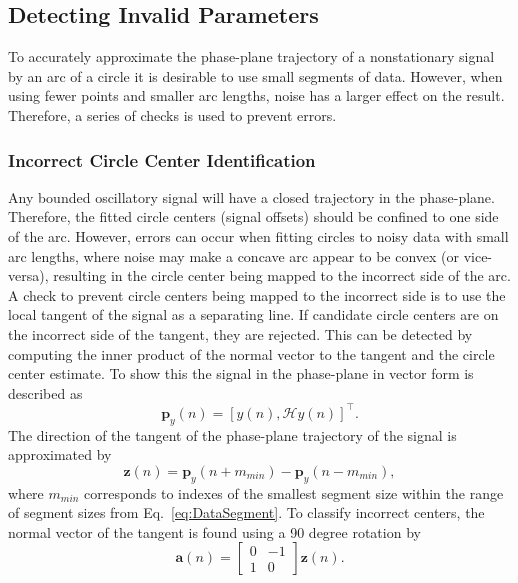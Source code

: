 \documentclass[journal,11pt,a4paper,onecolumn,draftcls]{IEEEtran}
\begin{document}
\subsection{Detecting Invalid Parameters}\label{sect:DetectingInvalidParameters}
To accurately approximate the phase-plane trajectory of a nonstationary signal by an arc of a circle it is desirable to use small segments of data. However, when using fewer points and smaller arc lengths, noise has a larger effect on the result. Therefore, a series of checks is used to prevent errors. 
\subsubsection{Incorrect Circle Center Identification}
Any bounded oscillatory signal will have a closed trajectory in the phase-plane. Therefore, the fitted circle centers (signal offsets) should be confined to one side of the arc. However, errors can occur when fitting circles to noisy data with small arc lengths, where noise may make a concave arc appear to be convex (or vice-versa), resulting in the circle center being mapped to the incorrect side of the arc. A check to prevent circle centers being mapped to the incorrect side is to use the local tangent of the signal as a separating line. If candidate circle centers are on the incorrect side of the tangent, they are rejected. This can be detected by computing the inner product of the normal vector to the tangent and the circle center estimate. To show this the signal in the phase-plane in vector form is described as
\begin{equation}
	\mathbf{p}_y(n) = \left[y\left(n\right),\mathcal{H}y\left(n\right)\right]^{\top}.
\end{equation}
The direction of the tangent of the phase-plane trajectory of the signal is approximated by 
\begin{equation}
	\mathbf{z}(n) = \mathbf{p}_y(n + m_{min}) - \mathbf{p}_y(n - m_{min}),
\end{equation}
where $m_{min}$ corresponds to indexes of the smallest segment size within the range of segment sizes from Eq.~\ref{eq:DataSegment}. To classify incorrect centers, the normal vector of the tangent is found using a 90 degree rotation by
\begin{equation}
	\mathbf{a}\left(n\right) = \left[\begin{array}{cc}
	0 & -1 \\
	1 & 0\end{array}\right]\mathbf{z}(n).
\end{equation}
\end{document}
